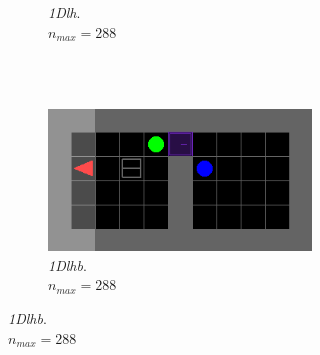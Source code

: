 \documentclass{article}
\begin{document}
\begin{figure}[H]
\begin{subfigure}[b]{0.3\linewidth}
\begin{subfigure}[b]{\linewidth}
    \caption{\textit{1Dlh}. \\
    \(n_{max}=288\)}
  \end{subfigure} \\\\
  \begin{subfigure}[b]{\linewidth}
    \centering
    \includegraphics[width=\linewidth]{Tasks/ObstructedMaze/1Dlhb}
    \caption{\textit{1Dlhb}. \\
    \(n_{max}=288\)}
  \end{subfigure}
  \end{subfigure}
  \hfill
  \begin{subfigure}[b]{0.6\linewidth}
  \begin{subfigure}[b]{0.32\linewidth}
    \centering

\end{subfigure}
\end{subfigure}
\end{figure}
\end{document}
